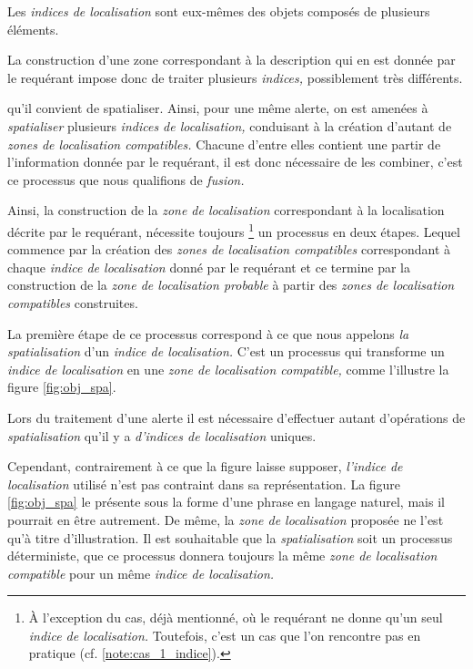 Les \emph{indices de localisation} sont eux-mêmes des objets composés
de plusieurs éléments.

La construction d'une zone correspondant à la description qui en est
donnée par le requérant impose donc de traiter plusieurs
\emph{indices,} possiblement très différents.

qu'il
convient de spatialiser. Ainsi, pour une même alerte, on est amenées à
\emph{spatialiser} plusieurs \emph{indices de localisation,}
conduisant à la création d'autant de \emph{zones de localisation
  compatibles.} Chacune d'entre elles contient une partir de
l'information donnée par le requérant, il est donc nécessaire de les
combiner, c'est ce processus que nous qualifions de \emph{fusion.}

Ainsi, la construction de la \emph{zone de localisation} correspondant
à la localisation décrite par le requérant, nécessite toujours
\footnote{À l'exception du cas, déjà mentionné, où le requérant ne
  donne qu'un seul \emph{indice de localisation.} Toutefois, c'est un
  cas que l'on rencontre pas en pratique
  (cf. \autoref{note:cas_1_indice}).} un processus en deux
étapes. Lequel commence par la création des \emph{zones de
  localisation compatibles} correspondant à chaque \emph{indice de
  localisation} donné par le requérant et ce termine par la
construction de la \emph{zone de localisation probable} à partir des
\emph{zones de localisation compatibles} construites.

La première étape de ce processus correspond à ce que nous appelons
\emph{la spatialisation} d'un \emph{indice de localisation.} C'est un
processus qui transforme un \emph{indice de localisation} en une
\emph{zone de localisation compatible,} comme l'illustre la figure
\ref{fig:obj_spa}.


Lors du traitement d'une alerte il est
nécessaire d'effectuer autant d'opérations de \emph{spatialisation}
qu'il y a \emph{d'indices de localisation} uniques.
%

Cependant, contrairement à ce que la figure laisse
supposer, \emph{l'indice de localisation} utilisé n'est pas contraint
dans sa représentation. La figure \ref{fig:obj_spa} le présente sous
la forme d'une phrase en langage naturel, mais il pourrait en être
autrement. De même, la \emph{zone de localisation} proposée ne l'est
qu'à titre d'illustration.
%
Il est souhaitable que la
\emph{spatialisation} soit un processus déterministe, \ie que ce
processus donnera toujours la même \emph{zone de localisation
  compatible} pour un même \emph{indice de localisation.}


